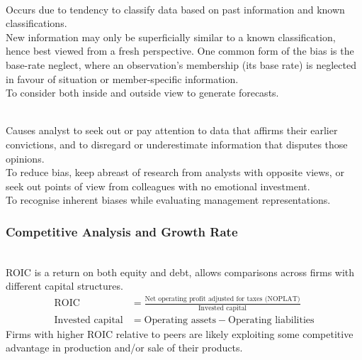 \begin{remark} \\
Occurs due to tendency to classify data based on past information and known classifications.\\
New information may only be superficially similar to a known classification, hence best viewed from a fresh perspective. One common form of the bias is the base-rate neglect, where an observation's membership (its base rate) is neglected in favour of situation or member-specific information.\\
To consider both inside and outside view to generate forecasts.
\end{remark}

\begin{remark} \\
Causes analyst to seek out or pay attention to data that affirms their earlier convictions, and to disregard or underestimate information that disputes those opinions.\\
To reduce bias, keep abreast of research from analysts with opposite views, or seek out points of view from colleagues with no emotional investment.\\
To recognise inherent biases while evaluating management representations.
\end{remark}

\subsubsection{Competitive Analysis and Growth Rate}

\begin{definition}  \\
ROIC is a return on both equity and debt, allows comparisons across firms with different capital structures.
\begin{align}
\text{ROIC} &= \frac{\text{Net operating profit adjusted for taxes (NOPLAT)}}{\text{Invested capital}} \nonumber \\
\text{Invested capital} &= \text{Operating assets} - \text{Operating liabilities} \nonumber
\end{align}
Firms with higher ROIC relative to peers are likely exploiting some competitive advantage in production and/or sale of their products.
\end{definition}

